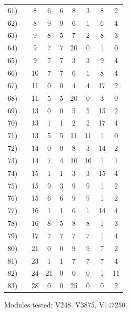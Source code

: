 \begin{longtable}{rc|ccccccc}
61) &  & 8 & 6 & 6 & 8 & 3 & 8 & 2 \\
62) &  & 8 & 9 & 9 & 6 & 1 & 6 & 4 \\
63) &  & 9 & 8 & 5 & 7 & 2 & 8 & 3 \\
64) &  & 9 & 7 & 7 & 20 & 0 & 1 & 0 \\
65) &  & 9 & 7 & 7 & 3 & 3 & 9 & 4 \\
66) &  & 10 & 7 & 7 & 6 & 1 & 8 & 4 \\
67) &  & 11 & 0 & 0 & 4 & 4 & 17 & 2 \\
68) &  & 11 & 5 & 5 & 20 & 0 & 3 & 0 \\
69) &  & 13 & 0 & 0 & 5 & 5 & 15 & 2 \\
70) &  & 13 & 1 & 1 & 2 & 2 & 17 & 4 \\
71) &  & 13 & 5 & 5 & 11 & 11 & 1 & 0 \\
72) &  & 14 & 0 & 0 & 8 & 3 & 14 & 2 \\
73) &  & 14 & 7 & 4 & 10 & 10 & 1 & 1 \\
74) &  & 15 & 1 & 1 & 3 & 3 & 15 & 4 \\
75) &  & 15 & 9 & 3 & 9 & 9 & 1 & 2 \\
76) &  & 15 & 6 & 6 & 9 & 9 & 1 & 2 \\
77) &  & 16 & 1 & 1 & 6 & 1 & 14 & 4 \\
78) &  & 16 & 8 & 5 & 8 & 8 & 1 & 3 \\
79) &  & 17 & 7 & 7 & 7 & 7 & 1 & 4 \\
80) &  & 21 & 0 & 0 & 9 & 9 & 7 & 2 \\
81) &  & 23 & 1 & 1 & 7 & 7 & 7 & 4 \\
82) &  & 24 & 21 & 0 & 0 & 0 & 1 & 11 \\
83) &  & 28 & 0 & 0 & 25 & 0 & 0 & 2 \\
\end{longtable}
\noindent Modules tested: V248, V3875, V147250.\\

